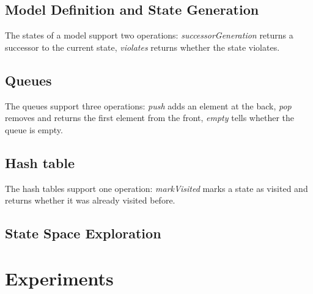 \documentclass[
fancyheadings, %
%
%
]{stsreprt}
\begin{document}

\section{Model Definition and State Generation}


The states of a model support two operations: \emph{successorGeneration} returns a successor to the current state, \emph{violates} returns whether the state violates.

\section{Queues}


The queues support three operations: \emph{push} adds an element at the back, \emph{pop} removes and returns the first element from the front, \emph{empty} tells whether the queue is empty.

\section{Hash table}


The hash tables support one operation: \emph{markVisited} marks a state as visited and returns whether it was already visited before.

\section{State Space Exploration}



\chapter{Experiments}
\end{document}
